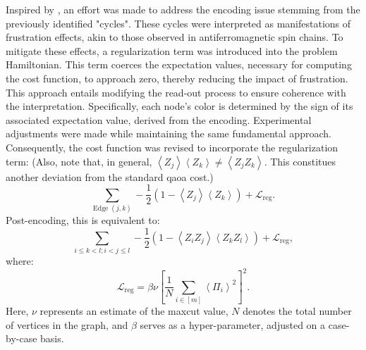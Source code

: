 Inspired by \cite{sciorilli2024largescale}, an effort was made to address the encoding issue stemming from the previously identified "cycles". These cycles were interpreted as manifestations of frustration effects, akin to those observed in antiferromagnetic spin chains. To mitigate these effects, a regularization term was introduced into the problem Hamiltonian. This term coerces the expectation values, necessary for computing the cost function, to approach zero, thereby reducing the impact of frustration. This approach entails modifying the read-out process to ensure coherence with the interpretation. Specifically, each node's color is determined by the sign of its associated expectation value, derived from the encoding. Experimental adjustments were made while maintaining the same fundamental approach. Consequently, the cost function was revised to incorporate the regularization term: (Also, note that, in general, $\left<Z_j\right>\left<Z_k\right> \neq \left<Z_jZ_k\right>$. This constitues another deviation from the standard \acrshort{qaoa} cost.)
\begin{equation}
\sum_{\text{Edge}\; (j,k)} -\frac{1}{2} \left(1-\left<Z_j\right>\left<Z_k\right>\right) + \mathcal{L}_{\text{reg}}.
\end{equation}
Post-encoding, this is equivalent to:
\begin{equation}
\sum_{i \leq k<l;i<j \leq l} -\frac{1}{2}(1-\left<Z_iZ_j\right>\left<Z_kZ_l\right>) + \mathcal{L}_{\text{reg}},
\end{equation}
where:
\begin{equation}
\mathcal{L}_{\text{reg}} = \beta \nu \left[\frac{1}{N}\sum_{i\in[m]}\left<\Pi_i\right>^2\right]^2.
\end{equation}
Here, $\nu$ represents an estimate of the \acrshort{maxcut} value, $N$ denotes the total number of vertices in the graph, and $\beta$ serves as a hyper-parameter, adjusted on a case-by-case basis.

